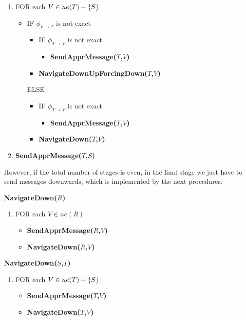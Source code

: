 \begin{enumerate}
\item FOR each $V\in ne(T)-{\{S\}}$
  
  \begin{itemize}
  \item[] IF $\phi_{V\rightarrow T}$ is not exact
    \begin{itemize}
    \item[] IF $\phi_{T\rightarrow V}$ is not exact
      \begin{itemize}
      \item[] \textsf{\textbf{SendApprMessage($T$,$V$)}}
      \end{itemize}
    \item[] \textsf{\textbf{NavigateDownUpForcingDown($T$,$V$)}}
    \end{itemize}
    ELSE
    \begin{itemize}
    \item[] IF $\phi_{T\rightarrow V}$ is not exact
      \begin{itemize}
      \item[] \textsf{\textbf{SendApprMessage($T$,$V$)}}
      \end{itemize}
    \item[] \textsf{\textbf{NavigateDown($T$,$V$)}}
    \end{itemize}
  \end{itemize}
  
\item \textsf{\textbf{SendApprMessage($T$,$S$)}}
\end{enumerate}

However, if the total number of stages is even, in the final stage we
just have to send messages downwards, which is implemented by the next
procedures.

\bigskip\noindent
\textsf{\textbf{NavigateDown($R$)}}

\begin{enumerate}
\item FOR each $V\in ne(R)$
  \begin{itemize}
  \item[] \textsf{\textbf{SendApprMessage($R$,$V$)}}
  \item[] \textsf{\textbf{NavigateDown($R$,$V$)}}
  \end{itemize}
\end{enumerate}


\bigskip\noindent
\textsf{\textbf{NavigateDown($S$,$T$)}}

\begin{enumerate}
\item FOR each $V\in ne(T)-{\{S\}}$
  \begin{itemize}
  \item[] \textsf{\textbf{SendApprMessage($T$,$V$)}}
  \item[] \textsf{\textbf{NavigateDown($T$,$V$)}}
  \end{itemize}
\end{enumerate}



